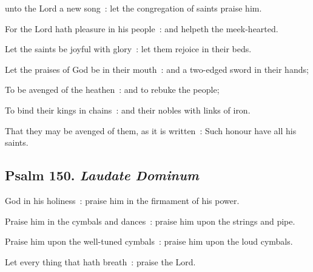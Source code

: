  unto the Lord a new song~: let the congregation of saints praise him.\par
{}
For the Lord hath pleasure in his people~: and helpeth the meek-hearted.\par
{}Let the saints be joyful with glory~: let them rejoice in their beds.\par
{}Let the praises of God be in their mouth~: and a two-edged sword in their hands;\par
{}To be avenged of the heathen~: and to rebuke the people;\par
{}To bind their kings in chains~: and their nobles with links of iron.\par
{}That they may be avenged of them, as it is written~: Such honour have all his saints.\par

\subsection{Psalm 150. \textit{Laudate Dominum}}

 God in his holiness~: praise him in the firmament of his power.\par
{}
Praise him in the cymbals and dances~: praise him upon the strings and pipe.\par
{}Praise him upon the well-tuned cymbals~: praise him upon the loud cymbals.\par
{}Let every thing that hath breath~: praise the Lord.